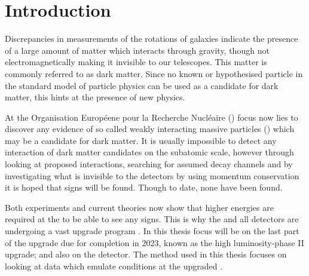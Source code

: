 \chapter{Introduction}\label{cha:intro}
Discrepancies in measurements of the rotations of galaxies indicate the presence of a large amount of matter which interacts through gravity, though not electromagnetically making it invisible to our telescopes. This matter is commonly referred to as dark matter. Since no known or hypothesised particle in the standard model of particle physics can be used as a candidate for dark matter, this hints at the presence of new physics. 

At the Organisation Européene pour la Recherche Nucléaire (\abbrCERN) focus now lies to discover any evidence of so called weakly interacting massive particles (\abbrWIMPS) which may be a candidate for dark matter. It is usually impossible to detect any interaction of dark matter candidates on the subatomic scale, however through looking at proposed interactions, searching for assumed decay channels and by investigating what is invisible to the detectors by using momentum conservation it is hoped that signs will be found. Though to date, none have been found. 

Both experiments and current theories now show that higher energies are required at the \abbrLHC to be able to see any signs. This is why the \abbrLHC and all detectors are undergoing a vast upgrade program \citep{ATLAS:LOI2}.
In this thesis focus will be on the last part of the upgrade due for completion in 2023, known as the high luminosity-\abbrLHC phase II upgrade; and also on the \abbrATLAS detector. The method used in this thesis focuses on looking at data which emulate conditions at the upgraded \abbrLHC.

\newpage

